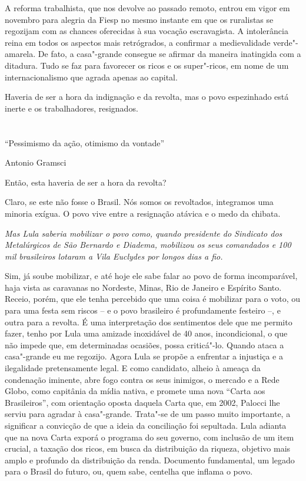 A reforma trabalhista, que nos devolve ao passado remoto, entrou em
vigor em novembro para alegria da Fiesp no mesmo instante em que os
ruralistas se regozijam com as chances oferecidas à sua vocação
escravagista. A intolerância reina em todos os aspectos mais
retrógrados, a confirmar a medievalidade verde"-amarela. De fato, a
casa"-grande consegue se afirmar da maneira inatingida com a ditadura.
Tudo se faz para favorecer os ricos e os super"-ricos, em nome de um
internacionalismo que agrada apenas ao capital.

Haveria de ser a hora da indignação e da revolta, mas o povo espezinhado
está inerte e os trabalhadores, resignados.



\chapter*{}

\epigraph{``Pessimismo da ação, otimismo da vontade''}{Antonio Gramsci}


\parindent0pt
\parskip\medskipamount

 Então, esta haveria de ser a hora da revolta?

 Claro, se este não fosse o Brasil. Nós somos os
revoltados, integramos uma minoria exígua. O povo vive entre a
resignação atávica e o medo da chibata.

\itshape
 Mas Lula saberia mobilizar o povo como, quando
presidente do Sindicato dos Metalúrgicos de São Bernardo e Diadema,
mobilizou os seus comandados e 100 mil brasileiros lotaram a Vila
Euclydes por longos dias a fio.

\normalfont
Sim, já soube mobilizar, e até hoje ele sabe falar ao
povo de forma incomparável, haja vista as caravanas no Nordeste, Minas,
Rio de Janeiro e Espírito Santo. Receio, porém, que ele tenha percebido
que uma coisa é mobilizar para o voto, ou para uma festa sem riscos -- e
o povo brasileiro é profundamente festeiro --, e outra para a revolta. É
uma interpretação dos sentimentos dele que me permito fazer, tenho por
Lula uma amizade inoxidável de 40 anos, incondicional, o que não impede
que, em determinadas ocasiões, possa criticá"-lo. Quando ataca a
casa"-grande eu me regozijo. Agora Lula se propõe a enfrentar a injustiça
e a ilegalidade pretensamente legal. E como candidato, alheio à ameaça
da condenação iminente, abre fogo contra os seus inimigos, o mercado e a
Rede Globo, como capitânia da mídia nativa, e promete uma nova ``Carta
aos Brasileiros'', com orientação oposta daquela Carta que, em 2002,
Palocci lhe serviu para agradar à casa"-grande. Trata"-se de um passo
muito importante, a significar a convicção de que a ideia da conciliação
foi sepultada. Lula adianta que na nova Carta exporá o programa do seu
governo, com inclusão de um item crucial, a taxação dos ricos, em busca
da distribuição da riqueza, objetivo mais amplo e profundo da
distribuição da renda. Documento fundamental, um legado para o Brasil do
futuro, ou, quem sabe, centelha que inflama o povo.

